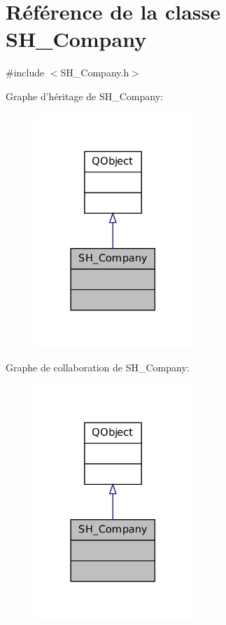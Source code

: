 \hypertarget{classSH__Company}{\section{Référence de la classe S\-H\-\_\-\-Company}
\label{classSH__Company}
}


{\ttfamily \#include $<$S\-H\-\_\-\-Company.\-h$>$}



Graphe d'héritage de S\-H\-\_\-\-Company\-:
\nopagebreak
\begin{figure}[H]
\begin{center}
\leavevmode
\includegraphics[width=170pt]{classSH__Company__inherit__graph}
\end{center}
\end{figure}


Graphe de collaboration de S\-H\-\_\-\-Company\-:
\nopagebreak
\begin{figure}[H]
\begin{center}
\leavevmode
\includegraphics[width=170pt]{classSH__Company__coll__graph}
\end{center}
\end{figure}


